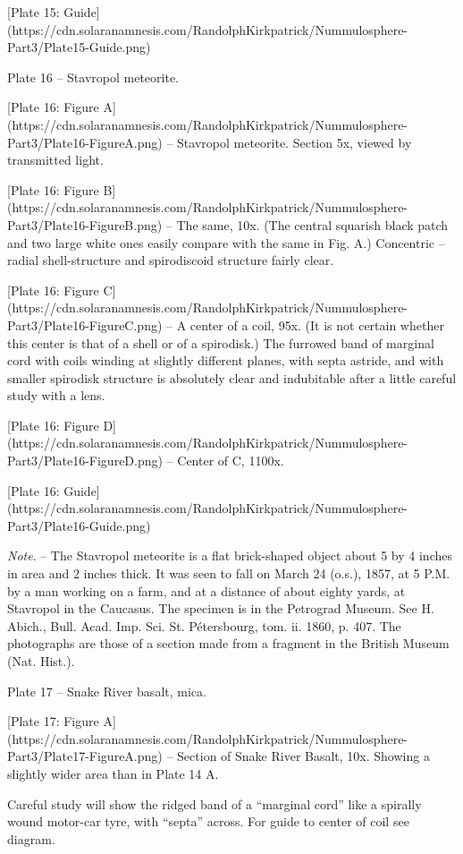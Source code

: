 \documentclass[a4paper, 12pt, oneside]{article}
\begin{document}
[Plate 15: Guide](https://cdn.solaranamnesis.com/RandolphKirkpatrick/Nummulosphere-Part3/Plate15-Guide.png)

Plate 16 -- Stavropol meteorite.

[Plate 16: Figure A](https://cdn.solaranamnesis.com/RandolphKirkpatrick/Nummulosphere-Part3/Plate16-FigureA.png) -- Stavropol meteorite. Section 5x, viewed by transmitted light.

[Plate 16: Figure B](https://cdn.solaranamnesis.com/RandolphKirkpatrick/Nummulosphere-Part3/Plate16-FigureB.png) -- The same, 10x. (The central squarish black patch and two large white ones easily compare with the same in Fig. A.) Concentric -- radial shell-structure and spirodiscoid structure fairly clear.

[Plate 16: Figure C](https://cdn.solaranamnesis.com/RandolphKirkpatrick/Nummulosphere-Part3/Plate16-FigureC.png) -- A center of a coil, 95x. (It is not certain whether this center is that of a shell or of a spirodisk.) The furrowed band of marginal cord with coils winding at slightly different planes, with septa astride, and with smaller spirodisk structure is absolutely clear and indubitable after a little careful study with a lens.

[Plate 16: Figure D](https://cdn.solaranamnesis.com/RandolphKirkpatrick/Nummulosphere-Part3/Plate16-FigureD.png) -- Center of C, 1100x.

[Plate 16: Guide](https://cdn.solaranamnesis.com/RandolphKirkpatrick/Nummulosphere-Part3/Plate16-Guide.png)

\emph{Note}. -- The Stavropol meteorite is a flat brick-shaped object about 5 by 4 inches in area and 2 inches thick. It was seen to fall on March 24 (o.s.), 1857, at 5 P.M. by a man working on a farm, and at a distance of about eighty yards, at Stavropol in the Caucasus. The specimen is in the Petrograd Museum. See H. Abich., Bull. Acad. Imp. Sci. St. Pétersbourg, tom. ii. 1860, p. 407. The photographs are those of a section made from a fragment in the British Museum (Nat. Hist.).

Plate 17 -- Snake River basalt, mica.

[Plate 17: Figure A](https://cdn.solaranamnesis.com/RandolphKirkpatrick/Nummulosphere-Part3/Plate17-FigureA.png) -- Section of Snake River Basalt, 10x. Showing a slightly wider area than in Plate 14 A.

Careful study will show the ridged band of a ``marginal cord'' like a spirally wound motor-car tyre, with ``septa'' across. For guide to center of coil see diagram.
\end{document}
